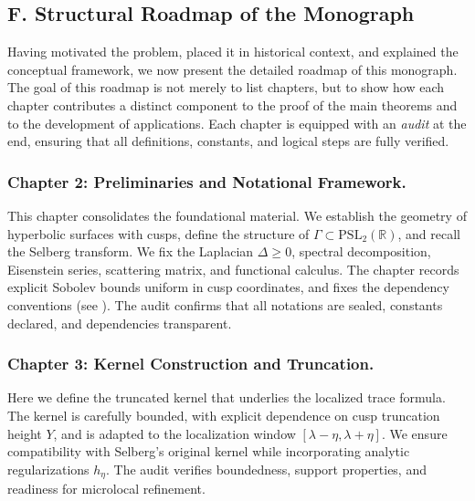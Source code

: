 
\subsection*{F. Structural Roadmap of the Monograph}

Having motivated the problem, placed it in historical context, and explained the conceptual framework,
we now present the detailed roadmap of this monograph. The goal of this roadmap is not merely to list chapters,
but to show how each chapter contributes a distinct component to the proof of the main theorems
and to the development of applications. Each chapter is equipped with an \emph{audit} at the end,
ensuring that all definitions, constants, and logical steps are fully verified.

\subsubsection*{Chapter 2: Preliminaries and Notational Framework.}
This chapter consolidates the foundational material. We establish the geometry of hyperbolic surfaces with cusps,
define the structure of $\Gamma\subset\mathrm{PSL}_2(\mathbb{R})$, and recall the Selberg transform.
We fix the Laplacian $\Delta\ge 0$, spectral decomposition, Eisenstein series, scattering matrix, and functional calculus.
The chapter records explicit Sobolev bounds uniform in cusp coordinates, and fixes the dependency conventions
(see ). The audit confirms that all notations are sealed, constants declared,
and dependencies transparent.

\subsubsection*{Chapter 3: Kernel Construction and Truncation.}
Here we define the truncated kernel that underlies the localized trace formula.
The kernel is carefully bounded, with explicit dependence on cusp truncation height $Y$,
and is adapted to the localization window $[\lambda-\eta,\lambda+\eta]$.
We ensure compatibility with Selberg’s original kernel while incorporating analytic regularizations $h_\eta$.
The audit verifies boundedness, support properties, and readiness for microlocal refinement.

